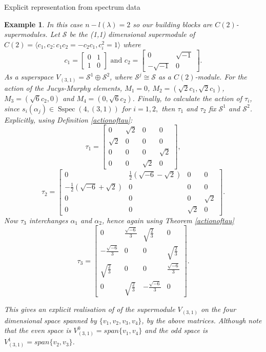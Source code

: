 \documentclass[a4paper,10pt]{amsart}
\newtheorem{example}[theorem]{Example}
\DeclareMathOperator{\Sspec}{Sspec}
\begin{document}
\begin{section}{Explicit representation from spectrum data}
\begin{example}
 In this case $n - l(\lambda) = 2$ so our building blocks are $C(2)$-supermodules. Let $\mathcal{S}$ be the (1,1) dimensional supermodule of $C(2) = \langle c_1 , c_2 : c_1c_2 = -c_2c_1 , c_i^2 =1\rangle$ where $$c_1 =  \begin{bmatrix} 0 & 1 \\ 1 &0\end{bmatrix} \text{ and } c_2 =  \begin{bmatrix} 0 & \sqrt{-1} \\ -\sqrt{-1} &0\end{bmatrix}.$$ 
 As a superspace  $V_{(3,1)} =\mathcal{S}^1 \oplus \mathcal{S}^2$, where $\mathcal{S}^j \cong \mathcal{S}$ as a $C(2)$-module. For the action of the Jucys-Murphy elements, $M_1= 0$, $M_2 = (\sqrt{2}c_1,\sqrt{2} c_1)$, $M_3 = (\sqrt{6}c_2,0)$ and $M_4 = (0,\sqrt{6}c_2)$. 
 Finally, to calculate the action of $\tau_i$, since $s_i(\alpha_j) \in \Sspec(4, (3,1)) $ for $i = 1,2,$ then $\tau_1$ and $ \tau_2$ fix $\mathcal{S}^1$ and $\mathcal{S}^2$. Explicitly, using Definition \ref{actionoftau}:
 $$\tau_1 =  \begin{bmatrix} 0 & \sqrt{2} & 0 & 0 \\ \sqrt{2} & 0 & 0 & 0 \\ 0 & 0 & 0 & \sqrt{2} \\ 0 & 0 & \sqrt{2} & 0 \end{bmatrix},$$
 $$\tau_2 = \begin{bmatrix} 0 & \frac{1}{2}(\sqrt{-6} - \sqrt{2}) & 0 & 0 \\ -\frac{1}{2}(\sqrt{-6}+\sqrt{2}) & 0 & 0 & 0 \\ 0 & 0 & 0 & \sqrt{2} \\ 0 & 0 & \sqrt{2} & 0 \end{bmatrix}.$$ %
 Now $\tau_3$ interchanges $\alpha_1$ and $\alpha_2$, hence again using Theorem \ref{actionoftau} 
 $$\tau_3 = \begin{bmatrix} 0 & \frac{\sqrt{-6}}{3} & \sqrt{\frac{2}{3}} & 0 \\ - \frac{\sqrt{-6}}{3} & 0 & 0 & \sqrt{\frac{2}{3}}  \\ \sqrt{\frac{2}{3}}  & 0 & 0 & \frac{\sqrt{-6}}{3} \\ 0 & \sqrt{\frac{2}{3}}  & - \frac{\sqrt{-6}}{3} & 0 \end{bmatrix}.$$%
 
This gives an explicit realisation of of the supermodule $V_{(3,1)}$ on the four dimensional space spanned by $\{v_1,v_2,v_3,v_4\}$, by the above matrices. Although note that the even space is $V_{(3,1)}^0 = span\{v_1,v_4\}$ and the odd space is $V_{(3,1)}^1 = span\{v_2,v_3\}$. %
 
 \end{example}
 


\end{section}
\end{document}
